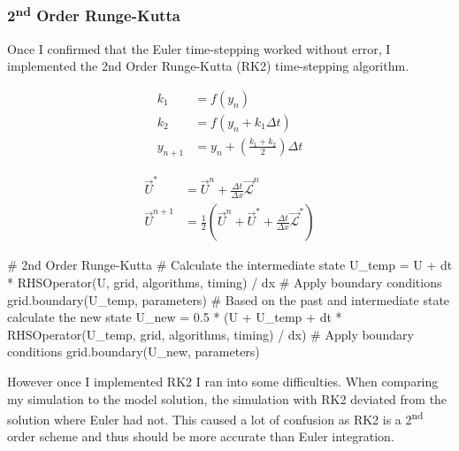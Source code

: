 \documentclass[
  letterpaper,
]{article}
\newenvironment{Shaded}{\begin{snugshade}}{\end{snugshade}}
\newcommand{\CommentTok}[1]{\textcolor[rgb]{0.37,0.37,0.37}{#1}}
\newcommand{\FloatTok}[1]{\textcolor[rgb]{0.68,0.00,0.00}{#1}}
\newcommand{\NormalTok}[1]{\textcolor[rgb]{0.00,0.23,0.31}{#1}}
\newcommand{\OperatorTok}[1]{\textcolor[rgb]{0.37,0.37,0.37}{#1}}
\begin{document}
\subsubsection{\texorpdfstring{2\textsuperscript{nd} Order
Runge-Kutta}{2nd Order Runge-Kutta}}\label{nd-order-runge-kutta}

Once I confirmed that the Euler time-stepping worked without error, I
implemented the 2nd Order Runge-Kutta (RK2) time-stepping algorithm.

\begin{align*}
k_1 &= f(y_n) \\
k_2 &= f(y_n+k_1 \Delta t) \\
y_{n+1} &= y_n + \left(\frac{k_1 + k_2}{2}\right)\Delta t
\end{align*}

\begin{align*}
\vec{U}^{*} &= \vec{U}^{n} + \frac{\Delta t}{\Delta x} \vec{\mathcal{L}}^{n} \\
\vec{U}^{n+1} &= \frac{1}{2} \left( \vec{U}^{n} + \vec{U}^{*} + \frac{\Delta t}{\Delta x} \vec{\mathcal{L}}^{*} \right)
\end{align*}

\begin{Shaded}
\begin{Highlighting}[]
\CommentTok{\# 2nd Order Runge{-}Kutta}
\CommentTok{\# Calculate the intermediate state }
\NormalTok{U\_temp }\OperatorTok{=}\NormalTok{ U }\OperatorTok{+}\NormalTok{ dt }\OperatorTok{*}\NormalTok{ RHSOperator(U, grid, algorithms, timing) }\OperatorTok{/}\NormalTok{ dx}
\CommentTok{\# Apply boundary conditions }
\NormalTok{grid.boundary(U\_temp, parameters)}
\CommentTok{\# Based on the past and intermediate state calculate the new state }
\NormalTok{U\_new }\OperatorTok{=} \FloatTok{0.5} \OperatorTok{*}\NormalTok{ (U }\OperatorTok{+}\NormalTok{ U\_temp }\OperatorTok{+}\NormalTok{ dt }\OperatorTok{*}\NormalTok{ RHSOperator(U\_temp, grid, algorithms, timing) }\OperatorTok{/}\NormalTok{ dx)}
\CommentTok{\# Apply boundary conditions }
\NormalTok{grid.boundary(U\_new, parameters)}
\end{Highlighting}
\end{Shaded}

However once I implemented RK2 I ran into some difficulties. When
comparing my simulation to the model solution, the simulation with RK2
deviated from the solution where Euler had not. This caused a lot of
confusion as RK2 is a 2\textsuperscript{nd} order scheme and thus should
be more accurate than Euler integration.
\end{document}
